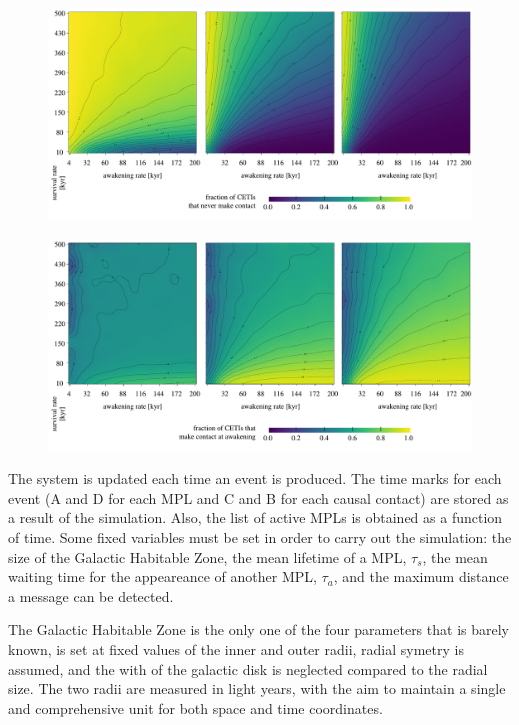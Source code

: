                                  
\begin{figure} %
   \centering
   \includegraphics[width=\textwidth]{matrix_1.pdf}
   \label{F_never_contact}
\end{figure}

  
\begin{figure} %
   \centering
   \includegraphics[width=\textwidth]{matrix_2.pdf}
   \label{F_C_at_A}
\end{figure}
                         

The system is updated each time an event is produced.
%
The time marks for each event (A and D for each MPL and C and B for
each causal contact) are stored as a result of the simulation.
%
Also, the list of active MPLs is obtained as a function of time.
%
Some fixed variables must be set in order to carry out the simulation:
the size of the Galactic Habitable Zone, the mean lifetime of a MPL,
$\tau_s$, the mean waiting time for the appeareance of another MPL,
$\tau_a$, and the maximum distance a message can be detected.



The Galactic Habitable Zone is the only one of the four parameters
that is barely known, is set at fixed values of the inner and outer
radii, radial symetry is assumed, and the with of the galactic disk is
neglected compared to the radial size.
%
The two radii are measured in light years, with the aim to maintain a
single and comprehensive unit for both space and time coordinates. 

